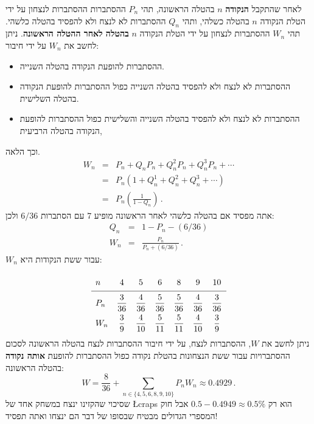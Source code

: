 לאחר שהתקבל
\textbf{הנקודה}
$n$
בהטלה הראשונה, תהי 
$P_n$
ההסתברות ההסתברות לנצחון על ידי הטלת הנקודה 
$n$
בהטלה כשלהי, ותהי
$Q_n$
ההסתברות לא לנצח ולא להפסיד בהטלה כלשהי.
תהי
$W_n$ 
ההסתברות לנצחון על ידי הטלת הנקודה 
$n$
\textbf{בהטלה לאחר ההטלה הראשונה}.
ניתן לחשב את
$W_n$ 
על ידי חיבור:
\begin{itemize}
\item 
ההסתברות להופעת הנקודה בהטלה השנייה. 
\item 
ההסתברות לא לנצח ולא להפסיד בהטלה השנייה כפול ההסתברות להופעת הנקודה בהטלה השלישית.
\item 
ההסתברות לא לנצח ולא להפסיד בהטלה השנייה והשלישית כפול ההסתברות להופעת הנקודה בהטלה הרביעית,
\end{itemize}
וכך הלאה.
\begin{eqnarray*}
W_n&=&P_n + Q_n P_n + Q_n^2 P_n+ Q_n^3 P_n  + \cdots\\
&=&P_n\left(1+Q_n^1 + Q_n^2+ Q_n^3  + \cdots\right)\\
&=&P_n\left(\frac{1}{1-Q_n}\right)\,.
\end{eqnarray*}
אתה מפסיד אם בהטלה כלשהי לאחר הראשונה מופיע 
$7$
עם הסתברות
$6/36$
ולכן:
\begin{eqnarray*}
Q_n &=& 1-P_n-(6/36)\\
W_n&=&\frac{P_n}{P_n+(6/36)}\,.
\end{eqnarray*}
$W_n$
עבור ששת הנקודות היא:
\[
\renewcommand{\arraystretch}{2}
\begin{array}{lcccccc}
n   & 4 & 5 & 6 & 8 & 9 & 10 \\\hline
P_n & \disfrac{3}{36} & \disfrac{4}{36} & \disfrac{5}{36} & \disfrac{5}{36} & \disfrac{4}{36} & \disfrac{3}{36} \\
W_n & \disfrac{3}{9} & \disfrac{4}{10} & \disfrac{5}{11} & \disfrac{5}{11} & \disfrac{4}{10} & \disfrac{3}{9}
\end{array}
\]
ניתן לחשב את
$W$, 
ההסתברות לנצח, על ידי חיבור ההסתברות לנצח בהטלה הראשונה לסכום ההסתברויות עבור ששת הנצחונות בהטלת נקודה כפול ההסתברות להופעת 
\textbf{אותה נקודה}
בהטלה הראשונה:
\begin{equation}\label{eq.9-a}
W=\frac{8}{36}+\sum_{n\in\{4,5,6,8,9,10\}} P_nW_n \approx 0.4929\,.
\end{equation}
שסיכוי שהקזינו ינצח במשחק אחד של 
\L{craps}
הוא רק
$0.5-0.4949\approx 0.5\%$
אבל חוק המספרי הגדולים מבטיח שבסופו של דבר הם ינצחו ואתה תפסיד!

